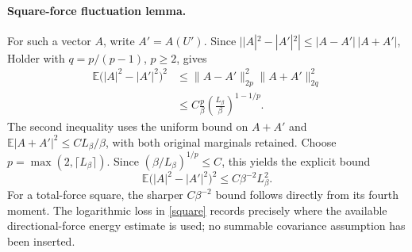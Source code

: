 \documentclass[11pt]{article}
\newcommand{\E}{\mathbb E}
\begin{document}
\paragraph{Square-force fluctuation lemma.}
For such a vector $A$, write $A'=A(U')$. Since
$||A|^2-|A'|^2|\le|A-A'|\,|A+A'|$, Holder with
$q=p/(p-1)$, $p\ge2$, gives
\begin{align*}
 \E\bigl(|A|^2-|A'|^2\bigr)^2
 &\le\|A-A'\|_{2p}^2\|A+A'\|_{2q}^2\\
 &\le C\frac p\beta\left(\frac{L_\beta}{\beta}\right)^{1-1/p}.
\end{align*}
The second inequality uses the uniform bound on $A+A'$ and
$\E|A+A'|^2\le C L_\beta/\beta$, with both original marginals retained.
Choose $p=\max(2,\lceil L_\beta\rceil)$. Since
$(\beta/L_\beta)^{1/p}\le C$, this yields the explicit bound
\begin{equation}\label{square}
 \E\bigl(|A|^2-|A'|^2\bigr)^2\le C\beta^{-2}L_\beta^2.
\end{equation}
For a total-force square, the sharper $C\beta^{-2}$ bound follows directly from its
fourth moment. The logarithmic loss in \eqref{square} records precisely where the
available directional-force energy estimate is used; no summable covariance assumption
has been inserted.
\end{document}
